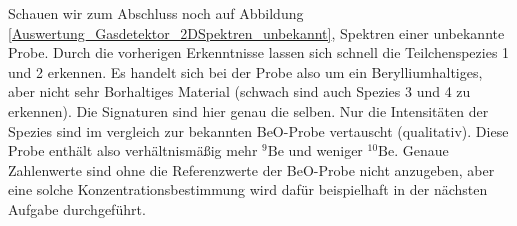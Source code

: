 Schauen wir zum Abschluss noch auf Abbildung \ref{Auswertung_Gasdetektor_2DSpektren_unbekannt}, Spektren einer unbekannte Probe.
Durch die vorherigen Erkenntnisse lassen sich schnell die Teilchenspezies 1 und 2 erkennen.
Es handelt sich bei der Probe also um ein Berylliumhaltiges, aber nicht sehr Borhaltiges Material (schwach sind auch Spezies 3 und 4 zu erkennen).
Die Signaturen sind hier genau die selben.
Nur die Intensitäten der Spezies sind im vergleich zur bekannten BeO-Probe vertauscht (qualitativ).
Diese Probe enthält also verhältnismäßig mehr $^{9}\text{Be}$ und weniger $^{10}\text{Be}$.
Genaue Zahlenwerte sind ohne die Referenzwerte der BeO-Probe nicht anzugeben, aber eine solche Konzentrationsbestimmung wird dafür beispielhaft in der nächsten Aufgabe durchgeführt.
